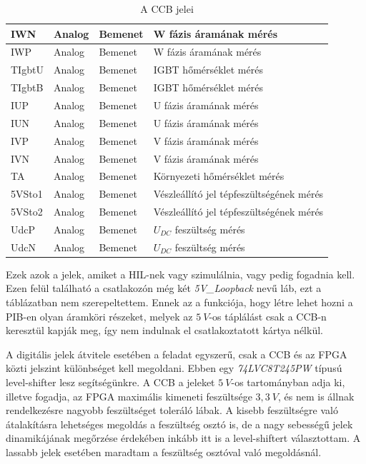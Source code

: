 \begin{table}[]
\begin{tabular}{|l|l|l|l|}
IWN            & Analog       & Bemenet      & W fázis áramának mérés                           \\ \hline
IWP            & Analog       & Bemenet      & W fázis áramának mérés                           \\ \hline
TIgbtU         & Analog       & Bemenet      & IGBT hőmérséklet mérés                           \\ \hline
TIgbtB         & Analog       & Bemenet      & IGBT hőmérséklet mérés                           \\ \hline
IUP            & Analog       & Bemenet      & U fázis áramának mérés                           \\ \hline
IUN            & Analog       & Bemenet      & U fázis áramának mérés                           \\ \hline
IVP            & Analog       & Bemenet      & V fázis áramának mérés                           \\ \hline
IVN            & Analog       & Bemenet      & V fázis áramának mérés                           \\ \hline
TA             & Analog       & Bemenet      & Környezeti hőmérséklet mérés                     \\ \hline
5VSto1         & Analog       & Bemenet      & Vészleállító jel tépfeszültségének mérés         \\ \hline
5VSto2         & Analog       & Bemenet      & Vészleállító jel tépfeszültségének mérés         \\ \hline
UdcP           & Analog       & Bemenet      & $U_{DC}$ feszültség mérés                        \\ \hline
UdcN           & Analog       & Bemenet      & $U_{DC}$ feszültség mérés                        \\ \hline
\end{tabular}
\caption{A CCB jelei}
\label{tab:ccbsignals}
\end{table}

Ezek azok a jelek, amiket a HIL-nek vagy szimulálnia, vagy pedig fogadnia kell. Ezen felül található a csatlakozón még két \emph{5V\_Loopback} nevű láb, ezt a táblázatban nem szerepeltettem. Ennek az a funkciója, hogy létre lehet hozni a PIB-en olyan áramköri részeket, melyek az $5\ V$-os táplálást csak a CCB-n keresztül kapják meg, így nem indulnak el csatlakoztatott kártya nélkül.

A digitális jelek átvitele esetében a feladat egyszerű, csak a CCB és az FPGA közti jelszint különbséget kell megoldani. Ebben egy \emph{74LVC8T245PW} típusú level-shifter lesz segítségünkre. A CCB a jeleket $5\ V$-os tartományban adja ki, illetve fogadja, az FPGA maximális kimeneti feszültsége $3,3\ V$, és nem is állnak rendelkezésre nagyobb feszültséget toleráló lábak. A kisebb feszültségre való átalakításra lehetséges megoldás a feszültség osztó is, de a nagy sebességű jelek dinamikájának megőrzése érdekében inkább itt is a level-shiftert választottam. A lassabb jelek esetében maradtam a feszültség osztóval való megoldásnál.

